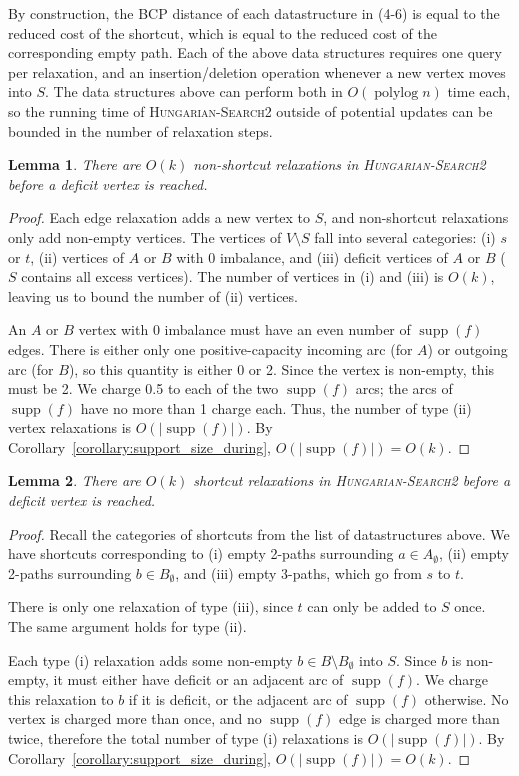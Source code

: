 \documentclass[11pt]{article}
\def\polylog{\mathop{\mathrm{polylog}}}
\def\supp{\operatorname{supp}}
\theoremstyle{plain}
\newtheorem{lemma}{Lemma}[section]
\numberwithin{figure}{section}
\begin{document}
By construction, the BCP distance of each datastructure in (4-6) is equal to
the reduced cost of the shortcut, which is equal to the reduced cost of the
corresponding empty path.
Each of the above data structures requires one query per relaxation, and an
insertion/deletion operation whenever a new vertex moves into $S$.
The data structures above can perform both in $O(\polylog n)$ time each, so the
running time of \textsc{Hungarian-Search2} outside of potential updates can be
bounded in the number of relaxation steps.

\begin{lemma}
\label{lemma:goldberg_hs_length1}
There are $O(k)$ non-shortcut relaxations in \textsc{Hungarian-Search2} before
a deficit vertex is reached.
\end{lemma}

\begin{proof}
Each edge relaxation adds a new vertex to $S$, and non-shortcut relaxations
only add non-empty vertices.
The vertices of $V \setminus S$ fall into several categories:
(i) $s$ or $t$, (ii) vertices of $A$ or $B$ with 0 imbalance, and (iii)
deficit vertices of $A$ or $B$ ($S$ contains all excess vertices).
The number of vertices in (i) and (iii) is $O(k)$, leaving us to bound the
number of (ii) vertices.

An $A$ or $B$ vertex with 0 imbalance must have an even number of $\supp(f)$
edges.
There is either only one positive-capacity incoming arc (for $A$) or outgoing
arc (for $B$), so this quantity is either 0 or 2.
Since the vertex is non-empty, this must be 2.
We charge 0.5 to each of the two $\supp(f)$ arcs; the arcs of $\supp(f)$
have no more than 1 charge each.
Thus, the number of type (ii) vertex relaxations is $O(|\supp(f)|)$.
By Corollary~\ref{corollary:support_size_during}, $O(|\supp(f)|) = O(k)$.
\end{proof}

\begin{lemma}
\label{lemma:goldberg_hs_length2}
There are $O(k)$ shortcut relaxations in \textsc{Hungarian-Search2} before a
deficit vertex is reached.
\end{lemma}

\begin{proof}
Recall the categories of shortcuts from the list of datastructures above.
We have shortcuts corresponding to (i) empty 2-paths surrounding
$a \in A_\emptyset$, (ii) empty 2-paths surrounding $b \in B_\emptyset$, and
(iii) empty 3-paths, which go from $s$ to $t$.

There is only one relaxation of type (iii), since $t$ can only be added to $S$
once.
The same argument holds for type (ii).

Each type (i) relaxation adds some non-empty $b \in B \setminus B_\emptyset$
into $S$.
Since $b$ is non-empty, it must either have deficit or an adjacent arc of
$\supp(f)$.
We charge this relaxation to $b$ if it is deficit, or the adjacent arc of
$\supp(f)$ otherwise.
No vertex is charged more than once, and no $\supp(f)$ edge is charged more
than twice, therefore the total number of type (i) relaxations is
$O(|\supp(f)|)$.
By Corollary~\ref{corollary:support_size_during}, $O(|\supp(f)|) = O(k)$.
\end{proof}
\end{document}
